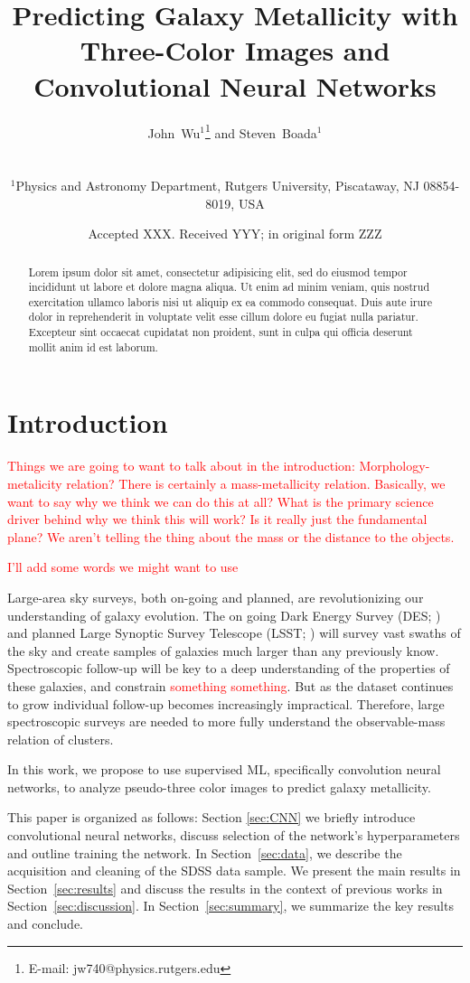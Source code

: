 \documentclass[fleqn,usenatbib]{mnras}
\title[Metallicity with CNNs]{Predicting Galaxy Metallicity with Three-Color Images and Convolutional Neural Networks}
\author[Wu and Boada]
{\parbox{\textwidth}{John~Wu$^{1}$\thanks{E-mail: jw740@physics.rutgers.edu} and
Steven~Boada$^{1}$}\vspace{0.4cm}\
\\
\parbox{\textwidth}{$^{1}$Physics and Astronomy Department, Rutgers University, Piscataway, NJ 08854-8019, USA\\}}
\date{Accepted XXX. Received YYY; in original form ZZZ}
\newcommand{\editorial}[1]{\textcolor{red}{#1}}
\begin{document}
\label{firstpage}
\pagerange{\pageref{firstpage}--\pageref{lastpage}}
\maketitle

\begin{abstract}
\noindent
Lorem ipsum dolor sit amet, consectetur adipisicing elit, sed do eiusmod tempor incididunt ut labore et dolore magna aliqua. Ut enim ad minim veniam, quis nostrud exercitation ullamco laboris nisi ut aliquip ex ea commodo consequat. Duis aute irure dolor in reprehenderit in voluptate velit esse cillum dolore eu fugiat nulla pariatur. Excepteur sint occaecat cupidatat non proident, sunt in culpa qui officia deserunt mollit anim id est laborum.
\end{abstract}

\section{Introduction}\label{sec:introduction}
\editorial{Things we are going to want to talk about in the introduction: Morphology-metalicity relation? There is certainly a mass-metallicity relation. Basically, we want to say why we think we can do this at all? What is the primary science driver behind why we think this will work? Is it really just the fundamental plane? We aren't telling the thing about the mass or the distance to the objects.}

\editorial{I'll add some words we might want to use}

Large-area sky surveys, both on-going and planned, are revolutionizing our understanding of galaxy evolution. The on going Dark Energy Survey (DES; \citealt{DES2005}) and planned Large Synoptic Survey Telescope (LSST; \citealt{LSST2012}) will survey vast swaths of the sky and create samples of galaxies much larger than any previously know. Spectroscopic follow-up will be key to a deep understanding of the properties of these galaxies, and constrain \editorial{something something}. But as the dataset continues to grow individual follow-up becomes increasingly impractical. Therefore, large spectroscopic surveys are needed to more fully understand the observable-mass relation of clusters.

In this work, we propose to use supervised ML, specifically convolution neural networks, to analyze pseudo-three color images to predict galaxy metallicity.

This paper is organized as follows: Section \ref{sec:CNN} we briefly introduce convolutional neural networks, discuss selection of the network's hyperparameters and outline training the network. In Section~\ref{sec:data}, we describe the acquisition and cleaning of the SDSS data sample. We present the main results in Section~\ref{sec:results} and discuss the results in the context of previous works in Section~\ref{sec:discussion}. In Section~\ref{sec:summary}, we summarize the key results and conclude.
\end{document}

